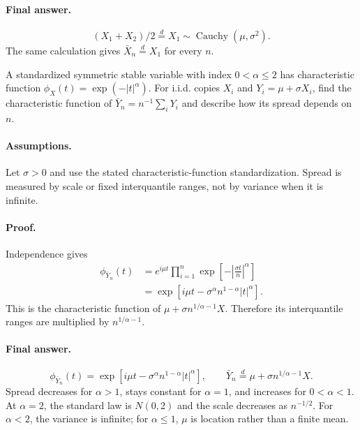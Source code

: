 \documentclass[answers,12pt,addpoints]{exam}
\begin{document}
\begin{questions}
\begin{solution}
\paragraph{Final answer.}
\[
\boxed{(X_1+X_2)/2\overset d=X_1
\sim\operatorname{Cauchy}(\mu,\sigma^2).}
\]
The same calculation gives $\bar X_n\overset d=X_1$ for every $n$.
\end{solution}

\question
A standardized symmetric stable variable with index $0<\alpha\leq2$
has characteristic function $\phi_X(t)=\exp(-|t|^\alpha)$.
For i.i.d. copies $X_i$ and $Y_i=\mu+\sigma X_i$, find the
characteristic function of $\bar Y_n=n^{-1}\sum_iY_i$ and describe
how its spread depends on $n$.

\begin{solution}
\paragraph{Assumptions.}
Let $\sigma>0$ and use the stated characteristic-function
standardization. Spread is measured by scale or fixed interquantile
ranges, not by variance when it is infinite.

\paragraph{Proof.}
Independence gives
\begin{align*}
\phi_{\bar Y_n}(t)
&=e^{i\mu t}\prod_{i=1}^n
\exp\left[-\left|\frac{\sigma t}{n}\right|^\alpha\right]\\
&=\exp\left[i\mu t-\sigma^\alpha n^{1-\alpha}|t|^\alpha\right].
\end{align*}
This is the characteristic function of
$\mu+\sigma n^{1/\alpha-1}X$. Therefore its interquantile ranges
are multiplied by $n^{1/\alpha-1}$.

\paragraph{Final answer.}
\[
\boxed{\phi_{\bar Y_n}(t)
=\exp\left[i\mu t-\sigma^\alpha n^{1-\alpha}|t|^\alpha\right],
\qquad
\bar Y_n\overset d=\mu+\sigma n^{1/\alpha-1}X.}
\]
Spread decreases for $\alpha>1$, stays constant for $\alpha=1$,
and increases for $0<\alpha<1$.
At $\alpha=2$, the standard law is $N(0,2)$ and the scale decreases
as $n^{-1/2}$. For $\alpha<2$, the variance is infinite; for
$\alpha\leq1$, $\mu$ is location rather than a finite mean.
\end{solution}


\end{questions}
\end{document}
